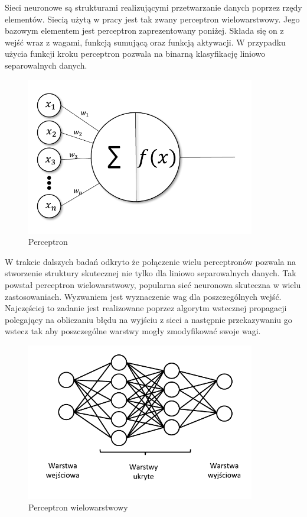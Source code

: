\documentclass[inzynierska]{pwr_wmat_praca_dyplomowa}
\theoremstyle{plain}
\numberwithin{theorem}{chapter}
\theoremstyle{definition}
\numberwithin{theorem}{chapter}
\begin{document}
Sieci neuronowe są strukturami realizującymi przetwarzanie danych poprzez rzędy elementów. Siecią użytą w pracy jest tak zwany perceptron wielowarstwowy. Jego bazowym elementem jest perceptron zaprezentowany poniżej. Składa się on z wejść wraz z wagami, funkcją sumującą oraz funkcją aktywacji. W przypadku użycia funkcji kroku perceptron pozwala na binarną klasyfikację liniowo separowalnych danych. 
\begin{figure}[ht]
	\centering
	\includegraphics[width=10cm]{images/perceptron_c.pdf}
	\caption{Perceptron}
	\label{perceptron}
\end{figure}
W trakcie dalszych badań odkryto że połączenie wielu perceptronów pozwala na stworzenie struktury skutecznej nie tylko dla liniowo separowalnych danych. Tak powstał perceptron wielowarstwowy, popularna sieć neuronowa skuteczna w wielu zastosowaniach. Wyzwaniem jest wyznaczenie wag dla poszczególnych wejść. Najczęściej to zadanie jest realizowane poprzez algorytm wstecznej propagacji polegający na obliczaniu błędu na wyjściu z sieci a następnie przekazywaniu go wstecz tak aby poszczególne warstwy mogły zmodyfikować swoje wagi. 
\begin{figure}[ht]
	\centering
	\includegraphics[width=10cm]{images/siec_c.pdf}
	\caption{Perceptron wielowarstwowy}
	\label{mlp}
\end{figure}
\end{document}
